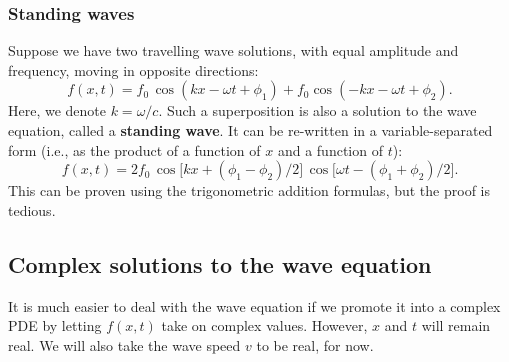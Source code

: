 \documentclass[10pt,a4paper]{article}
\begin{document}
\subsubsection{Standing waves}
\label{standing-waves}

Suppose we have two travelling wave solutions, with equal amplitude and
frequency, moving in opposite directions:
\begin{equation}
f(x,t) = f_0 \, \cos(kx - \omega t + \phi_1) + f_0 \cos(-kx - \omega t + \phi_2).
\end{equation}
Here, we denote $k = \omega/c$. Such a superposition is also a
solution to the wave equation, called a \textbf{standing wave}. It can
be re-written in a variable-separated form (i.e., as the product of a
function of $x$ and a function of $t$):
\begin{equation}
f(x,t) = 2f_0 \, \cos\big[kx + (\phi_1-\phi_2)/2\big]\, \cos\big[\omega t - (\phi_1+\phi_2)/2\big].
\label{standingsol}
\end{equation}
This can be proven using the trigonometric addition formulas, but the
proof is tedious.

\subsection{Complex solutions to the wave equation}
\label{complex-solutions-to-the-wave-equation}

It is much easier to deal with the wave equation if we promote it into a
complex PDE by letting $f(x,t)$ take on complex values. However, $x$
and $t$ will remain real. We will also take the wave speed $v$ to be
real, for now.
\end{document}
